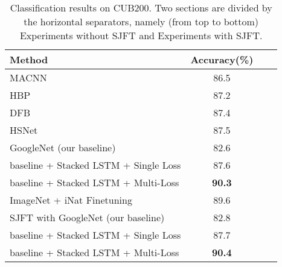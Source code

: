 \documentclass[10pt,twocolumn,letterpaper]{article}
\begin{document}
\begin{table}[t]\small
\setlength{\abovecaptionskip}{10pt}
\setlength{\belowcaptionskip}{-10pt}
\begin{center}
\begin{tabular}{@{}lccc@{}}
\toprule
Method                                             & Accuracy(\%)       \\ \midrule
MACNN \cite{zheng17}                               & 86.5               \\
HBP \cite{Yu_2018_ECCV}                            & 87.2               \\
DFB \cite{wang16}                                  & 87.4               \\
HSNet \cite{Lam_17_HSNet}                          & 87.5               \\
GoogleNet (our baseline)                           & 82.6               \\
baseline + Stacked LSTM + Single Loss              & 87.6               \\
baseline + Stacked LSTM + Multi-Loss               & \textbf{90.3}               \\\midrule
ImageNet + iNat Finetuning \cite{cui18}            & 89.6               \\
SJFT with GoogleNet (our baseline)                 & 82.8               \\
baseline + Stacked LSTM + Single Loss              & 87.7               \\
baseline + Stacked LSTM + Multi-Loss               & \textbf{90.4}              \\
\bottomrule
\end{tabular}
\end{center}
\caption{Classification results on CUB200. Two sections are divided by the horizontal separators, namely (from top to bottom) Experiments without SJFT and Experiments with SJFT.}
\label{tab:CUB200}
\end{table}
\end{document}
